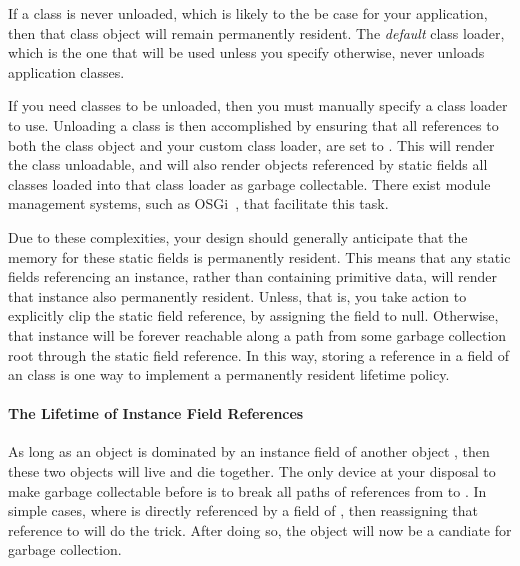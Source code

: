 If a class is never unloaded, which is likely to the be case for your
application, then that class object will remain permanently resident. The
\emph{default} class loader, which is the one that will be used unless you
specify otherwise, never unloads application classes. 

If you need classes to be unloaded, then you must manually specify a class loader
to use. Unloading a class is then accomplished by ensuring that all references to
both the class object and your custom class loader, are set to . This
will render the class unloadable, and will also render objects referenced by
static fields all classes loaded into that class loader as garbage collectable.
There exist module management systems, such as OSGi~\cite{OSGi_2007}, that
facilitate this task.

Due to these complexities, your design should generally anticipate that the
memory for these static fields is permanently resident. This means that any
static fields referencing an instance, rather than containing primitive data,
will render that instance also permanently resident. Unless, that is, you take
action to explicitly clip the static field reference, by assigning the field to
null. Otherwise, that instance will be forever reachable along a path from some
garbage collection root through the static field reference. In this way, storing
a reference in a  field of an class is one way to implement a
permanently resident lifetime policy.

\paragraph{The Lifetime of Instance Field References}

As long as an object  is dominated by an instance field of another object
, then these two objects will live and die together. The only device at
your disposal to make  garbage collectable before  is to break
all paths of references from  to . In simple cases, where
 is directly referenced by a field of , then reassigning that
reference to  will do the trick. After doing so, the  object
will now be a candiate for garbage collection. 












